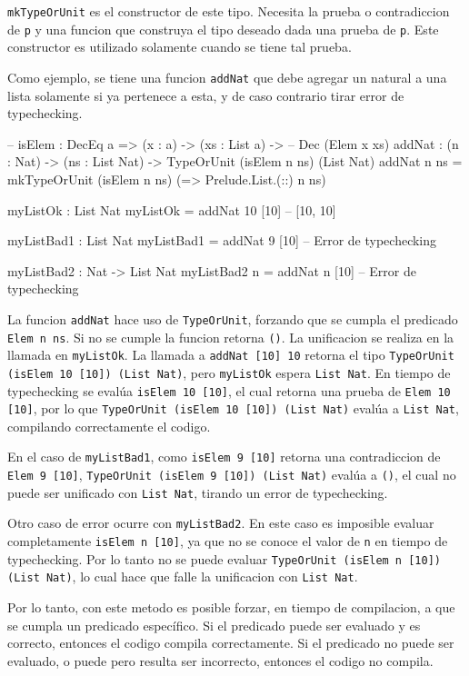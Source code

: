 \texttt{mkTypeOrUnit} es el constructor de este tipo. Necesita la prueba o contradiccion de \texttt{p} y una funcion que construya el tipo deseado dada una prueba de \texttt{p}. Este constructor es utilizado solamente cuando se tiene tal prueba.

Como ejemplo, se tiene una funcion \texttt{addNat} que debe agregar un natural a una lista solamente si ya pertenece a esta, y de caso contrario tirar error de typechecking.

\begin{code}
-- isElem : DecEq a => (x : a) -> (xs : List a) -> 
--  Dec (Elem x xs)
addNat : (n : Nat) -> (ns : List Nat) -> 
  TypeOrUnit (isElem n ns) (List Nat)
addNat n ns = mkTypeOrUnit (isElem n ns) 
  (\isElem => Prelude.List.(::) n ns)

myListOk : List Nat
myListOk = addNat 10 [10] -- [10, 10]

myListBad1 : List Nat
myListBad1 = addNat 9 [10] -- Error de typechecking

myListBad2 : Nat -> List Nat
myListBad2 n = addNat n [10] -- Error de typechecking
\end{code}

La funcion \texttt{addNat} hace uso de \texttt{TypeOrUnit}, forzando que se cumpla el predicado \texttt{Elem n ns}. Si no se cumple la funcion retorna \texttt{()}. La unificacion se realiza en la llamada en \texttt{myListOk}. La llamada a \texttt{addNat [10] 10} retorna el tipo \texttt{TypeOrUnit (isElem 10 [10]) (List Nat)}, pero \texttt{myListOk} espera \texttt{List Nat}. En tiempo de typechecking se evalúa \texttt{isElem 10 [10]}, el cual retorna una prueba de \texttt{Elem 10 [10]}, por lo que \texttt{TypeOrUnit (isElem 10 [10]) (List Nat)} evalúa a \texttt{List Nat}, compilando correctamente el codigo.

En el caso de \texttt{myListBad1}, como \texttt{isElem 9 [10]} retorna una contradiccion de \texttt{Elem 9 [10]}, \texttt{TypeOrUnit (isElem 9 [10]) (List Nat)} evalúa a \texttt{()}, el cual no puede ser unificado con \texttt{List Nat}, tirando un error de typechecking.

Otro caso de error ocurre con \texttt{myListBad2}. En este caso es imposible evaluar completamente \texttt{isElem n [10]}, ya que no se conoce el valor de \texttt{n} en tiempo de typechecking. Por lo tanto no se puede evaluar \texttt{TypeOrUnit (isElem n [10]) (List Nat)}, lo cual hace que falle la unificacion con \texttt{List Nat}.

Por lo tanto, con este metodo es posible forzar, en tiempo de compilacion, a que se cumpla un predicado específico. Si el predicado puede ser evaluado y es correcto, entonces el codigo compila correctamente. Si el predicado no puede ser evaluado, o puede pero resulta ser incorrecto, entonces el codigo no compila.

